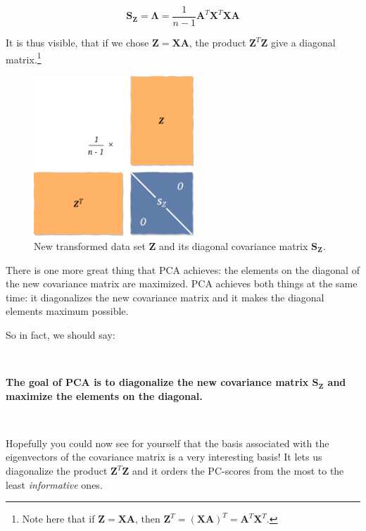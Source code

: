 \documentclass[10pt,twocolumn]{article}
\begin{document}
\begin{equation}
\bm{S_Z}  = \bm{\Lambda} = \frac{1}{n-1} \bm{A}^T  \bm{X}^T \bm{X} \bm{A}
\end{equation}

It is thus visible, that if we chose $\bm{Z} = \bm{X} \bm{A}$, the product $\bm{Z}^T \bm{Z}$ give a diagonal matrix.\footnote{Note here that if $\bm{Z} = \bm{X} \bm{A}$, then $\bm{Z}^T = (\bm{X} \bm{A})^T = \bm{A}^T \bm{X}^T$.}

\begin{figure}[H]
\centering\includegraphics[width=6cm]{PC-scores.png}
\caption{New transformed data set $\bm{Z}$ and its diagonal covariance matrix $\bm{S_Z}$.}
\label{fig:PC-scores}
\end{figure}

There is one more great thing that PCA achieves: the elements on the diagonal of the new covariance matrix are maximized. PCA achieves both things at the same time: it diagonalizes the new covariance matrix and it makes the diagonal elements maximum possible.

So in fact, we should say:

\,\,

\textbf{The goal of PCA is to diagonalize the new covariance matrix $\bm{S_Z}$ and maximize the elements on the diagonal.}

\,\,

Hopefully you could now see for yourself that the basis associated with the eigenvectors of the covariance matrix is a very interesting basis! It lets us diagonalize the product $\bm{Z}^T \bm{Z}$ and it orders the PC-scores from the most to the least \textit{informative} ones.
\end{document}
